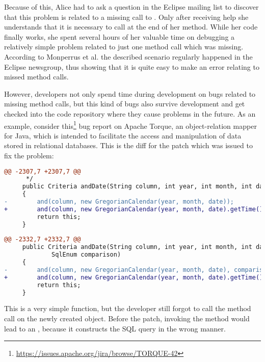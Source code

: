 Because of this, Alice had to ask a question in the Eclipse mailing list to discover that this problem is related to a missing call to .
Only after receiving help she understands that it is necessary to call  at the end of her  method.
While her code finally works, she spent several hours of her valuable time on debugging a relatively simple problem related to just one method call which was missing.
According to Monperrus et al. the described scenario regularly happened in the Eclipse newsgroup, thus showing that it is quite easy to make an error relating to missed method calls.

However, developers not only spend time during development on bugs related to missing method calls, but this kind of bugs also survive development and get checked into the code repository where they cause problems in the future.
As an example, consider this\footnote{\url{https://issues.apache.org/jira/browse/TORQUE-42}} bug report on Apache Torque, an object-relation mapper for Java, which is intended to facilitate the access and manipulation of data stored in relational databases.
This is the diff for the patch which was issued to fix the problem:
\begin{lstlisting}[language=diff]
@@ -2307,7 +2307,7 @@
      */
     public Criteria andDate(String column, int year, int month, int date)
     {
-        and(column, new GregorianCalendar(year, month, date));
+        and(column, new GregorianCalendar(year, month, date).getTime());
         return this;
     }
 
@@ -2332,7 +2332,7 @@
     public Criteria andDate(String column, int year, int month, int date,
             SqlEnum comparison)
     {
-        and(column, new GregorianCalendar(year, month, date), comparison);
+        and(column, new GregorianCalendar(year, month, date).getTime(), comparison);
         return this;
     }
\end{lstlisting}
This is a very simple function, but the developer still forgot to call the  method call on the newly created  object.
Before the patch, invoking the  method would lead to an , because it constructs the SQL query in the wrong manner.

